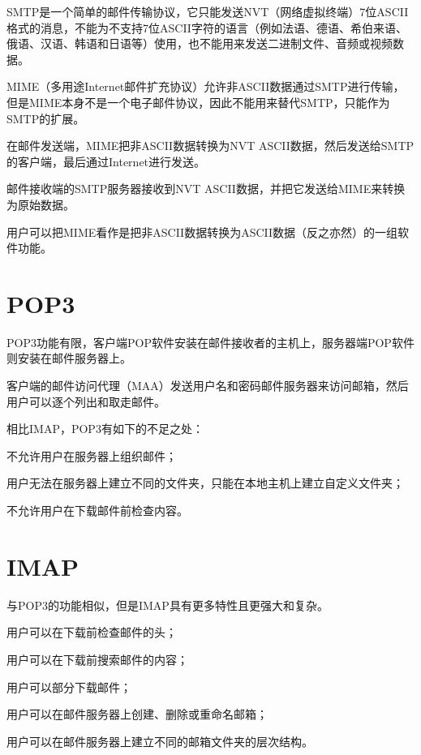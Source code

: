 SMTP是一个简单的邮件传输协议，它只能发送NVT（网络虚拟终端）7位ASCII格式的消息，不能为不支持7位ASCII字符的语言（例如法语、德语、希伯来语、俄语、汉语、韩语和日语等）使用，也不能用来发送二进制文件、音频或视频数据。

MIME（多用途Internet邮件扩充协议）允许非ASCII数据通过SMTP进行传输，但是MIME本身不是一个电子邮件协议，因此不能用来替代SMTP，只能作为SMTP的扩展。

\begin{compactitem}
\item 在邮件发送端，MIME把非ASCII数据转换为NVT ASCII数据，然后发送给SMTP的客户端，最后通过Internet进行发送。
\item 邮件接收端的SMTP服务器接收到NVT ASCII数据，并把它发送给MIME来转换为原始数据。
\end{compactitem}

用户可以把MIME看作是把非ASCII数据转换为ASCII数据（反之亦然）的一组软件功能。



\section{POP3}

POP3功能有限，客户端POP软件安装在邮件接收者的主机上，服务器端POP软件则安装在邮件服务器上。

客户端的邮件访问代理（MAA）发送用户名和密码邮件服务器来访问邮箱，然后用户可以逐个列出和取走邮件。

相比IMAP，POP3有如下的不足之处：

\begin{compactitem}
\item 不允许用户在服务器上组织邮件；
\item 用户无法在服务器上建立不同的文件夹，只能在本地主机上建立自定义文件夹；
\item 不允许用户在下载邮件前检查内容。
\end{compactitem}

\section{IMAP}

与POP3的功能相似，但是IMAP具有更多特性且更强大和复杂。

\begin{compactitem}
\item 用户可以在下载前检查邮件的头；
\item 用户可以在下载前搜索邮件的内容；
\item 用户可以部分下载邮件；
\item 用户可以在邮件服务器上创建、删除或重命名邮箱；
\item 用户可以在邮件服务器上建立不同的邮箱文件夹的层次结构。
\end{compactitem}


